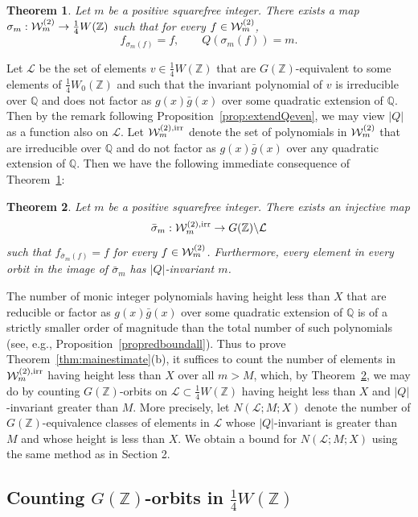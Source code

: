 \documentclass[11pt]{article}
\def\Z{{\mathbb Z}}
\def\irr{{\rm irr}}
\def\Q{{\mathbb Q}}
\def\U{{\mathcal W}}
\def\Z{{\mathbb Z}}
\def\Q{{\mathbb Q}}
\def\LL{{\mathcal L}}
\def\w{{\rm {(2)}}}
\newtheorem{theorem}{Theorem}[section]
\begin{document}
\begin{theorem}\label{th:mapeven}
Let $m$ be a positive squarefree integer. There exists a map
$\sigma_m:\U_m^\w\to \frac14W(\Z)$ such that for every $f\in \U_m^\w$,
\begin{equation}\label{eq:liftQe}
f_{\sigma_m(f)}=f,\qquad Q(\sigma_m(f)) = m.
\end{equation}
\end{theorem}

Let $\LL$ be the set of elements $v\in \frac14W(\Z)$ that are $G(\Z)$-equivalent to some elements of $\frac14 W_0(\Z)$ and such that
the invariant polynomial of $v$ is irreducible
over $\Q$ and does not factor as $g(x)\bar{g}(x)$ over some quadratic extension of $\Q$.
Then by the remark following Proposition~\ref{prop:extendQeven}, we may view $|Q|$ as a function also on $\LL$.
Let $\U_m^{\w,\irr}$ denote the set of polynomials in $\U_m^\w$
that are irreducible
over $\Q$ and do not factor as $g(x)\bar{g}(x)$ over any quadratic extension of $\Q$. Then we have the following immediate consequence of Theorem~\ref{th:mapeven}:

\begin{theorem}\label{keymaporbiteven}
Let $m$ be a positive squarefree integer. There exists an injective map
$$\bar{\sigma}_m:\U_m^{\w,\irr}\to G(\Z)\backslash\LL$$ such that
$f_{\bar{\sigma}_m(f)}=f$ for every $f\in \U_m^\w$. Furthermore, every element
in every orbit in the image of $\bar{\sigma}_m$ has $|Q|$-invariant $m$.
\end{theorem}

The number of monic integer polynomials having height less than $X$ that are reducible or factor as $g(x)\bar{g}(x)$ over some quadratic extension of $\Q$ is of a strictly smaller order of magnitude than the total number of such polynomials (see, e.g., Proposition~\ref{propredboundall}). Thus to prove Theorem~\ref{thm:mainestimate}(b), it suffices to count the number of elements in
$\U_m^{\w,\irr}$ having height less than $X$ over all $m>M$, which, by Theorem~\ref{keymaporbiteven}, we may do by counting
$G(\Z)$-orbits on $\LL\subset \frac14W(\Z)$ having height less than $X$ and $|Q|$-invariant greater than $M$.
More precisely, let $N(\LL;M;X)$ denote the number of $G(\Z)$-equivalence classes of elements in
$\LL$ whose $|Q|$-invariant is greater than $M$ and whose height is
less than $X$. We obtain a bound for $N(\LL;M;X)$ using the same method as in Section 2.



\subsection{Counting $G(\Z)$-orbits in $\frac14W(\Z)$}\label{scoeffeven}
\end{document}
